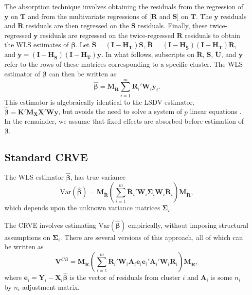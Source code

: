 \documentclass[12pt]{article}\usepackage[]{graphicx}\usepackage[]{color}
\newcommand{\Var}{\text{Var}}
\newcommand{\bm}{\mathbf}
\newcommand{\bs}{\boldsymbol}
\begin{document}
The absorption technique involves obtaining the residuals from the regression of $\bm{y}$ on $\bm{T}$ and from the multivariate regressions of $[\bm{R}$ and $\bm{S}]$ on $\bm{T}$. 
The $\bm{y}$ residuals and $\bm{R}$ residuals are then regressed on the $\bm{S}$ residuals. 
Finally, these twice-regressed $\bm{y}$ residuals are regressed on the twice-regressed $\bm{R}$ residuals to obtain the WLS estimates of $\bs\beta$. 
Let $\bm{\ddot{S}} = \left(\bm{I} - \bm{H_T}\right)\bm{S}$, $\bm{\ddot{R}} = \left(\bm{I} - \bm{H_{\ddot{S}}}\right)\left(\bm{I} - \bm{H_T}\right)\bm{R}$, and $\bm{\ddot{y}} = \left(\bm{I} - \bm{H_{\ddot{S}}}\right)\left(\bm{I} - \bm{H_T}\right)\bm{y}$. 
In what follows, subscripts on $\bm{\ddot{R}}$, $\bm{\ddot{S}}$,  $\bm{\ddot{U}}$, and $\bm{\ddot{y}}$ refer to the rows of these matrices corresponding to a specific cluster. 
The WLS estimator of $\bs\beta$ can then be written as
\begin{equation}
\label{eq:WLS}
\bs{\hat\beta} = \bm{M_{\ddot{R}}} \sum_{i=1}^m \bm{\ddot{R}}_i' \bm{W}_i \bm{\ddot{y}}_i. 
\end{equation}
This estimator is algebraically identical to the LSDV estimator, $\bs{\hat\beta} = \bm{K}'\bm{M_X} \bm{X}' \bm{W} \bm{y}$, but avoids the need to solve a system of $p$ linear equations \citep[][provides further details on sequential absorption]{Davis2002estimating}. In the remainder, we assume that fixed effects are absorbed before estimation of $\bs\beta$. 

\subsection{Standard CRVE}

The WLS estimator $\bs{\hat\beta}$, has true variance
\begin{equation}
\label{eq:var_WLS}
\Var\left(\bs{\hat\beta}\right) = \bm{M_{\ddot{R}}}\left(\sum_{i=1}^m \bm{\ddot{R}}_i' \bm{W}_i \bs\Sigma_i \bm{W}_i\bm{\ddot{R}}_i\right) \bm{M_{\ddot{R}}},
\end{equation}
which depends upon the unknown variance matrices $\bs\Sigma_i$. 

The CRVE involves estimating $\Var\left(\bs{\hat\beta}\right)$ empirically, without imposing structural assumptions on $\bs\Sigma_i$. 
There are several versions of this approach, all of which can be written as
\begin{equation}
\label{eq:V_small}
\bm{V}^{CR} = \bm{M_{\ddot{R}}}\left(\sum_{i=1}^m \bm{\ddot{R}}_i'\bm{W}_i \bm{A}_i \bm{e}_i \bm{e}_i' \bm{A}_i' \bm{W}_i \bm{\ddot{R}}_i\right) \bm{M_{\ddot{R}}},
\end{equation}
where $\bm{e}_i = \bm{Y}_i - \bm{X}_i \bs{\hat\beta}$ is the vector of residuals from cluster $i$ and $\bm{A}_i$ is some $n_i$ by $n_i$ adjustment matrix. 
\end{document}

